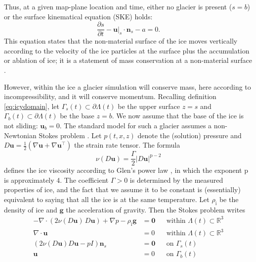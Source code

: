 \documentclass[hidelinks,onefignum,onetabnum,final]{siamart220329}  %
\newcommand{\RR}{\mathbb{R}}
\newcommand{\grad}{\nabla}
\newcommand{\bg}{\mathbf{g}}
\newcommand{\bn}{\mathbf{n}}
\newcommand{\bu}{\mathbf{u}}
\newcommand{\bzero}{\bm{0}}
\newcommand{\pp}{{\text{p}}}
\newcommand{\rhoi}{\rho_{\text{i}}}
\begin{document}
Thus, at a given map-plane location and time, either no glacier is present ($s=b$) or the surface kinematical equation (SKE) holds:
\begin{equation}
\frac{\partial s}{\partial t} - \bu|_s \cdot \bn_s - a = 0.  \label{eq:ske}
\end{equation}
This equation states that the non-material surface of the ice moves vertically according to the velocity of the ice particles at the surface plus the accumulation or ablation of ice; it is a statement of mass conservation at a non-material surface \cite{Aschwandenetal2012}.

However, within the ice a glacier simulation will conserve mass, here according to incompressibility, and it will conserve momentum.  Recalling definition \eqref{eq:icydomain}, let $\Gamma_s(t) \subset \partial \Lambda(t)$ be the upper surface $z=s$ and
$\Gamma_b(t) \subset \partial \Lambda(t)$ be the base $z=b$.  We now assume that the base of the ice is not sliding: $\bu_b=0$.  The standard model for such a glacier assumes a non-Newtonian Stokes problem \cite{GreveBlatter2009}.  Let $p(t,x,z)$ denote the (solution) pressure and $D\bu=\frac{1}{2}(\grad \bu + \grad \bu^{\top})$ the strain rate tensor.  The formula
\begin{equation}
\nu(D\bu) = \frac{\Gamma}{2} |D\bu|^{\pp-2} \label{eq:glen}
\end{equation}
defines the ice viscosity according to Glen's power law \cite{GreveBlatter2009}, in which the exponent $\pp$ is approximately 4.  The coefficient $\Gamma>0$ is determined by the measured properties of ice, and the fact that we assume it to be constant is (essentially) equivalent to saying that all the ice is at the same temperature.  Let $\rhoi$ be the density of ice and $\bg$ the acceleration of gravity.  Then the Stokes problem writes
\begin{subequations}
\label{eq:stokes}
\begin{align}
- \nabla \cdot \left(2 \nu(D\bu)\, D\bu\right) + \nabla p - \rhoi \bg &= \bzero && \text{within $\Lambda(t) \subset \RR^3$} \\
\nabla \cdot \bu &= 0 && \text{within $\Lambda(t) \subset \RR^3$} \\
\left(2 \nu(D\bu) D\bu - pI\right) \bn_s &= \bzero && \text{on $\Gamma_s(t)$} \\
\bu  &= 0 && \text{on $\Gamma_b(t)$}
\end{align}
\end{subequations}
\end{document}
